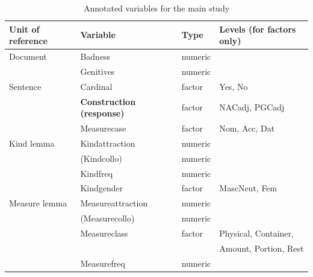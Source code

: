 \begin{table}
  \centering
  \begin{tabular}{llll}
    Unit of reference & Variable                      & Type    & Levels (for factors only) \\
    \midrule
    Document       & Badness                          & numeric &                           \\
                   & Genitives                        & numeric &                           \\
    Sentence       & Cardinal                         & factor  & Yes, No                   \\
                   & \textbf{Construction (response)} & factor  & NACadj, PGCadj            \\
                   & Measurecase                      & factor  & Nom, Acc, Dat             \\
    Kind lemma     & Kindattraction                   & numeric &                           \\
                   & (Kindcollo)                      & numeric &                           \\
                   & Kindfreq                         & numeric &                           \\
		   & Kindgender                       & factor  & MascNeut, Fem             \\
    Measure lemma  & Measureattraction                & numeric &                           \\
                   & (Measurecollo)                   & numeric &                           \\
                   & Measureclass                     & factor  & Physical, Container,      \\
                   &                                  &         & Amount, Portion, Rest     \\
                   & Measurefreq                      & numeric &                           \\
  \end{tabular}
  \caption{Annotated variables for the main study}
  \label{tab:variables}
\end{table}

